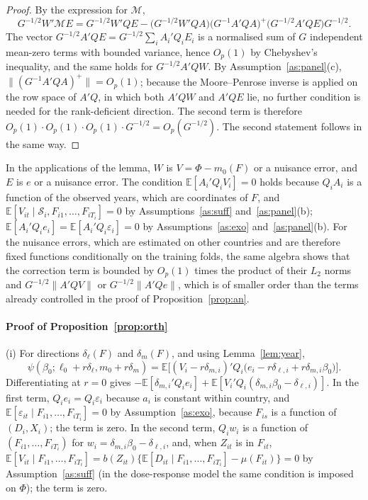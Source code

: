 \documentclass[pdflatex,sn-basic]{sn-jnl}%
\theoremstyle{thmstyleone}
\theoremstyle{thmstyletwo}
\newcommand{\E}{\mathbb{E}}
\newcommand{\M}{\mathcal{M}}
\begin{document}
\begin{appendices}
\begin{proof}
By the expression for $\M$,
\[
G^{-1/2}W'\M E=G^{-1/2}W'QE-\big(G^{-1/2}W'QA\big)\big(G^{-1}A'QA\big)^{+}\big(G^{-1/2}A'QE\big)G^{-1/2}.
\] The vector $G^{-1/2}A'QE=G^{-1/2}\sum_iA_i'Q_iE_i$ is a normalised sum of $G$ independent mean-zero terms with bounded variance, hence $O_p(1)$ by Chebyshev's inequality, and the same holds for $G^{-1/2}A'QW$. By Assumption~\ref{as:panel}(c), $\|(G^{-1}A'QA)^{+}\|=O_p(1)$; because the Moore--Penrose inverse is applied on the row space of $A'Q$, in which both $A'QW$ and $A'QE$ lie, no further condition is needed for the rank-deficient direction. The second term is therefore $O_p(1)\cdot O_p(1)\cdot O_p(1)\cdot G^{-1/2}=O_p(G^{-1/2})$. The second statement follows in the same way.
\end{proof}

In the applications of the lemma, $W$ is $V=\Phi-m_0(F)$ or a nuisance error, and $E$ is $e$ or a nuisance error. The condition $\E[A_i'Q_iV_i]=0$ holds because $Q_iA_i$ is a function of the observed years, which are coordinates of $F$, and $\E[V_{it}\mid\mathcal S_i,F_{i1},\dots,F_{iT_i}]=0$ by Assumptions~\ref{as:suff} and~\ref{as:panel}(b); $\E[A_i'Q_ie_i]=\E[A_i'Q_i\varepsilon_i]=0$ by Assumptions~\ref{as:exo} and~\ref{as:panel}(b). For the nuisance errors, which are estimated on other countries and are therefore fixed functions conditionally on the training folds, the same algebra shows that the correction term is bounded by $O_p(1)$ times the product of their $L_2$ norms and $G^{-1/2}\|A'QV\|$ or $G^{-1/2}\|A'Qe\|$, which is of smaller order than the terms already controlled in the proof of Proposition~\ref{prop:an}.

\paragraph{Proof of Proposition~\ref{prop:orth}}
(i) For directions $\delta_\ell(F)$ and $\delta_m(F)$, and using Lemma~\ref{lem:year},
\[
\psi(\beta_0;\ell_0+r\delta_\ell,m_0+r\delta_m)=\E\big[(V_i-r\delta_{m,i})'Q_i\big(e_i-r\delta_{\ell,i}+r\delta_{m,i}\beta_0\big)\big].
\]
Differentiating at $r=0$ gives $-\E[\delta_{m,i}'Q_ie_i]+\E[V_i'Q_i(\delta_{m,i}\beta_0-\delta_{\ell,i})]$. In the first term, $Q_ie_i=Q_i\varepsilon_i$ because $a_i$ is constant within country, and $\E[\varepsilon_{it}\mid F_{i1},\dots,F_{iT_i}]=0$ by Assumption~\ref{as:exo}, because $F_{is}$ is a function of $(D_i,X_i)$; the term is zero. In the second term, $Q_iw_i$ is a function of $(F_{i1},\dots,F_{iT_i})$ for $w_i=\delta_{m,i}\beta_0-\delta_{\ell,i}$, and, when $Z_{it}$ is in $F_{it}$, $\E[V_{it}\mid F_{i1},\dots,F_{iT_i}]=b(Z_{it})\{\E[D_{it}\mid F_{i1},\dots,F_{iT_i}]-\mu(F_{it})\}=0$ by Assumption~\ref{as:suff} (in the dose-response model the same condition is imposed on $\Phi$); the term is zero.


\end{appendices}
\end{document}
